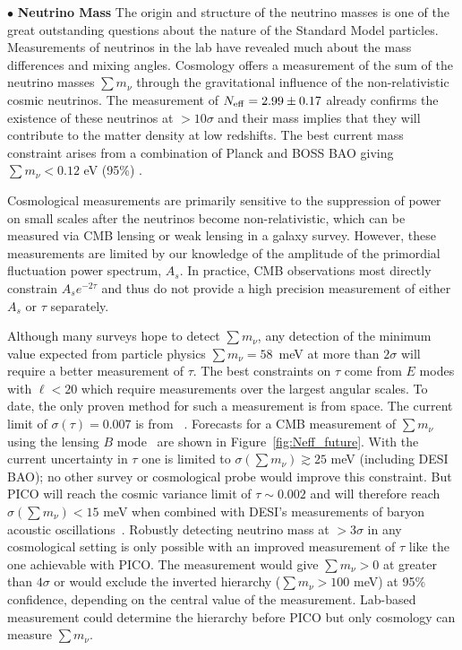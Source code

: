 \documentclass[PICOReport.tex]{subfiles}
\begin{document}
%
%
 $\bullet$ {\bf Neutrino Mass} \hspace{0.1in} \label{neutrino_fundamental} The origin and structure of the neutrino masses is one of the great outstanding  questions about the nature of the Standard Model particles.  Measurements of neutrinos in the lab have revealed much  about the mass differences and mixing angles.  Cosmology offers a  measurement of the sum of the neutrino masses $\sum m_\nu$ through the gravitational influence of the non-relativistic  cosmic neutrinos.  The measurement of ${N_{\rm eff}} = 2.99 \pm 0.17$ \cite{Planck2018_VI} already confirms the existence of these neutrinos at $>10\sigma$ and their mass implies that they will contribute to the matter density at low redshifts.  The best current mass constraint arises from a combination of  Planck and BOSS \ac{BAO} giving $\sum m_\nu < 0.12$ eV (95\%) \cite{Planck2018_VI}.

Cosmological measurements are primarily sensitive to the suppression of power on small scales after the neutrinos become non-relativistic, which can be measured via CMB lensing or weak lensing in a galaxy survey.  However, these measurements are limited by our knowledge of the amplitude of the primordial fluctuation power spectrum, $A_s$.  In practice, CMB observations most directly constrain $A_s e^{-2 \tau}$ and thus do not provide a high precision measurement of either $A_s$ or $\tau$ separately.  


Although many surveys hope to detect $\sum m_\nu$, any detection of the minimum value expected from particle physics $\sum m_\nu = 58$~meV at more than $2 \sigma$ will require a better measurement of $\tau$.  The best constraints on $\tau$ come from $E$ modes with $\ell < 20$ which require measurements over the largest angular scales. To date, the only proven method for such a measurement is from space. The current limit of $\sigma({\tau}) = 0.007$ is from \planck~\cite{planck2016_xlvi}.  Forecasts for a CMB measurement of $\sum m_\nu$ using the lensing $B$ mode~\cite{Kaplinghat:2003bh} are shown in Figure~\ref{fig:Neff_future}.  With the current uncertainty in $\tau$ one is limited to  $\sigma(\sum m_\nu) \gtrsim 25$ meV (including DESI BAO); no other survey or cosmological probe would improve this constraint.  But PICO will reach the cosmic variance limit of $\tau \sim 0.002$ and will therefore reach $\sigma(\sum m_\nu) < 15$ meV when combined with DESI's measurements of baryon acoustic oscillations~\cite{Levi:2013gra}.  Robustly detecting neutrino mass at  $> 3\sigma$ in any cosmological setting is only possible with an improved measurement of $\tau$ like the one achievable with PICO. The measurement would give  $\sum m_\nu>0$ at greater than $4\sigma$ or would exclude the inverted hierarchy ($\sum m_\nu > 100$ meV) at 95\% confidence, depending on the central value of the measurement.  Lab-based measurement could determine the hierarchy before PICO but only cosmology can measure $\sum m_\nu$.
\end{document}
